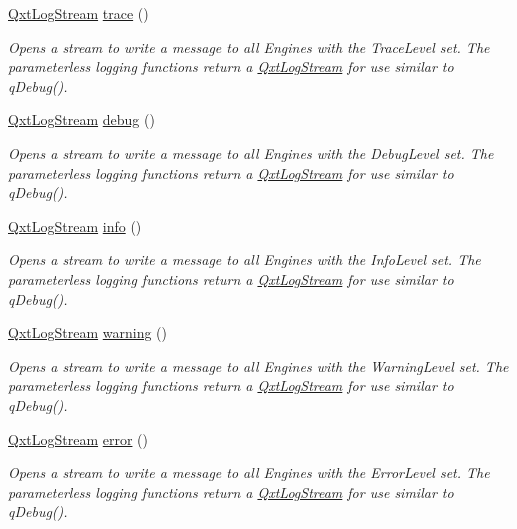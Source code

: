 \begin{DoxyCompactItemize}
\hyperlink{class_qxt_log_stream}{Qxt\-Log\-Stream} \hyperlink{class_qxt_logger_ab4a26caa39351ab2455ae78619ed28e1}{trace} ()
\begin{DoxyCompactList}\small\item\em Opens a stream to write a message to all Engines with the Trace\-Level set. The parameterless logging functions return a \hyperlink{class_qxt_log_stream}{Qxt\-Log\-Stream} for use similar to q\-Debug(). \end{DoxyCompactList}\item 
\hyperlink{class_qxt_log_stream}{Qxt\-Log\-Stream} \hyperlink{class_qxt_logger_ae345628e323fcf2a208839b715c10acf}{debug} ()
\begin{DoxyCompactList}\small\item\em Opens a stream to write a message to all Engines with the Debug\-Level set. The parameterless logging functions return a \hyperlink{class_qxt_log_stream}{Qxt\-Log\-Stream} for use similar to q\-Debug(). \end{DoxyCompactList}\item 
\hyperlink{class_qxt_log_stream}{Qxt\-Log\-Stream} \hyperlink{class_qxt_logger_aa5f536eac253b8d2cc0d878656f00d20}{info} ()
\begin{DoxyCompactList}\small\item\em Opens a stream to write a message to all Engines with the Info\-Level set. The parameterless logging functions return a \hyperlink{class_qxt_log_stream}{Qxt\-Log\-Stream} for use similar to q\-Debug(). \end{DoxyCompactList}\item 
\hyperlink{class_qxt_log_stream}{Qxt\-Log\-Stream} \hyperlink{class_qxt_logger_a626773e279a23900e078ea308956b298}{warning} ()
\begin{DoxyCompactList}\small\item\em Opens a stream to write a message to all Engines with the Warning\-Level set. The parameterless logging functions return a \hyperlink{class_qxt_log_stream}{Qxt\-Log\-Stream} for use similar to q\-Debug(). \end{DoxyCompactList}\item 
\hyperlink{class_qxt_log_stream}{Qxt\-Log\-Stream} \hyperlink{class_qxt_logger_ad5a1c26a3bcd9649badd8d0038e94e59}{error} ()
\begin{DoxyCompactList}\small\item\em Opens a stream to write a message to all Engines with the Error\-Level set. The parameterless logging functions return a \hyperlink{class_qxt_log_stream}{Qxt\-Log\-Stream} for use similar to q\-Debug(). \end{DoxyCompactList}\item 

\end{DoxyCompactItemize}
